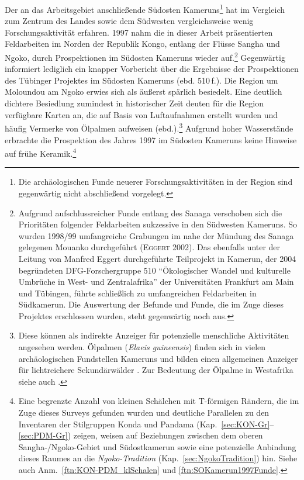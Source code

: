 Der an das Arbeitsgebiet anschließende Südosten Kameruns\footnote{Die archäologischen Funde neuerer Forschungsaktivitäten in der Region \parencite{MorinRivat.2014} sind gegenwärtig nicht abschließend vorgelegt.} hat im Vergleich zum Zentrum des Landes sowie dem Südwesten vergleichsweise wenig Forschungsaktivität erfahren. 1997 nahm \textcite{Eggert.2002} die in dieser Arbeit präsentierten Feldarbeiten im Norden der Republik Kongo, entlang der Flüsse \mbox{Sangha} und \mbox{Ngoko}, durch Prospektionen im Südosten Kameruns wieder auf.\footnote{Aufgrund aufschlussreicher Funde entlang des Sanaga verschoben sich die Prioritäten folgender Feldarbeiten sukzessive in den Südwesten Kameruns. So wurden 1998/99 umfangreiche Grabungen im nahe der Mündung des Sanaga gelegenen Mouanko durchgeführt (\textsc{Eggert} 2002). Das ebenfalls unter der Leitung von Manfred Eggert durchgeführte Teilprojekt in Kamerun, der 2004 begründeten DFG-Forschergruppe 510 \enquote{Ökologischer Wandel und kulturelle Umbrüche in West- und Zentralafrika} der Universitäten Frankfurt am Main und Tübingen, führte schließlich zu umfangreichen Feldarbeiten in Südkamerun. Die Auswertung der Befunde und Funde, die im Zuge dieses Projektes erschlossen wurden, steht gegenwärtig noch aus.} Gegenwärtig informiert lediglich ein knapper Vorbericht über die Ergebnisse der Prospektionen des Tübinger Projektes im Südosten Kameruns (ebd. 510\,f.). Die Region um Moloundou am \mbox{Ngoko} erwies sich als äußerst spärlich besiedelt. Eine deutlich dichtere Besiedlung zumindest in historischer Zeit deuten für die Region verfügbare Karten an, die auf Basis von Luftaufnahmen erstellt wurden und häufig Vermerke von Ölpalmen aufweisen (ebd.).\footnote{Diese können als indirekte Anzeiger für potenzielle menschliche Aktivitäten angesehen werden. Ölpalmen (\textit{Elaeis guineensis}) finden sich in vielen archäologischen Fundstellen Kameruns und bilden einen allgemeinen Anzeiger für lichtreichere Sekundärwälder \parencite{Neumann.2006}. Zur Bedeutung der Ölpalme in Westafrika siehe auch \textcites{Sowunmi.1999}{DAndrea.2006}{Logan.2012}.} Aufgrund hoher Wasserstände erbrachte die Prospektion des Jahres 1997 im Südosten Kameruns keine Hinweise auf frühe Keramik.\footnote{Eine begrenzte Anzahl von kleinen Schälchen mit T-förmigen Rändern, die im Zuge dieses Surveys gefunden wurden und deutliche Parallelen zu den Inventaren der Stilgruppen Konda und Pandama (Kap.~\ref{sec:KON-Gr}--\ref{sec:PDM-Gr}) zeigen, weisen auf Beziehungen zwischen dem oberen \mbox{Sangha}-/\mbox{Ngoko}-Gebiet und Südostkamerun sowie eine potenzielle Anbindung dieses Raumes an die \textit{\mbox{Ngoko}-Tradition} (Kap.~\ref{sec:NgokoTradition}) hin. Siehe auch Anm.~\ref{ftn:KON-PDM_klSchalen} und \ref{ftn:SOKamerun1997Funde}.}


